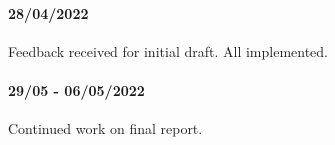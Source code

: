 \begin{appendices}
\paragraph{28/04/2022}
Feedback received for initial draft. All implemented.

\paragraph{29/05 - 06/05/2022}
Continued work on final report.









\end{appendices}